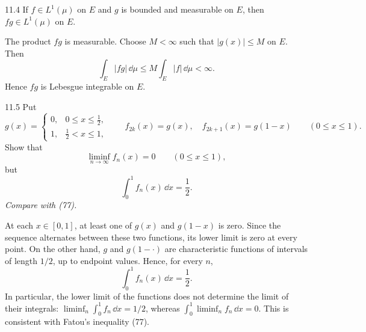 \documentclass[11pt,oneside]{article}
\begin{document}
\begin{exercise}{11.4}
If $f\in L^1(\mu)$ on $E$ and $g$ is bounded and measurable on $E$, then $fg\in L^1(\mu)$ on $E$.
\end{exercise}
\begin{solution}
The product $fg$ is measurable. Choose $M<\infty$ such that $|g(x)|\le M$ on $E$. Then
\[
 \int_E|fg|\,\dd\mu\le M\int_E|f|\,\dd\mu<\infty.
\]
Hence $fg$ is Lebesgue integrable on $E$.
\end{solution}

\begin{exercise}{11.5}
Put
\[
 g(x)=\begin{cases}0,&0\le x\le\frac12,\\1,&\frac12<x\le1,\end{cases}
\qquad
 f_{2k}(x)=g(x),\quad f_{2k+1}(x)=g(1-x)
 \qquad(0\le x\le1).
\]
Show that
\[
 \liminf_{n\to\infty}f_n(x)=0\qquad(0\le x\le1),
\]
but
\[
 \int_0^1 f_n(x)\,\dd x=\frac12.
\]
\textit{Compare with (77).}
\end{exercise}
\begin{solution}
At each $x\in[0,1]$, at least one of $g(x)$ and $g(1-x)$ is zero. Since the sequence alternates between these two functions, its lower limit is zero at every point. On the other hand, $g$ and $g(1-\cdot)$ are characteristic functions of intervals of length $1/2$, up to endpoint values. Hence, for every $n$,
\[
 \int_0^1 f_n(x)\,\dd x=\frac12.
\]
In particular, the lower limit of the functions does not determine the limit of their integrals: $\liminf_n\int_0^1 f_n\,\dd x=1/2$, whereas $\int_0^1\liminf_n f_n\,\dd x=0$. This is consistent with Fatou's inequality (77).
\end{solution}
\end{document}

